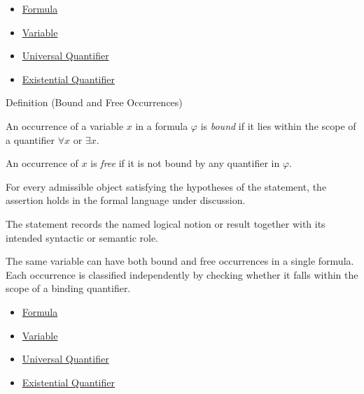\begin{dependencies}
\begin{itemize}
  \item \hyperref[def:formula]{Formula}
  \item \hyperref[def:variable]{Variable}
  \item \hyperref[def:universal-q]{Universal Quantifier}
  \item \hyperref[def:existential-q]{Existential Quantifier}
\end{itemize}
\end{dependencies}

\begin{definitionbox}{Definition (Bound and Free Occurrences)}
\begin{definition}\label{def:bound-free}
An occurrence of a variable $x$ in a formula $\varphi$ is \emph{bound} if it
lies within the scope of a quantifier $\forall x$ or $\exists x$.

An occurrence of $x$ is \emph{free} if it is not bound by any quantifier in
$\varphi$.
\end{definition}
\end{definitionbox}
\begin{remark*}
For every admissible object satisfying the hypotheses of the statement, the
assertion holds in the formal language under discussion.
\end{remark*}

\begin{remark*}[Interpretation]
The statement records the named logical notion or result together with its
intended syntactic or semantic role.
\end{remark*}


\begin{remark*}[Exposition]
The same variable can have both bound and free occurrences in a single formula.
Each occurrence is classified independently by checking whether it falls within
the scope of a binding quantifier.
\end{remark*}


\begin{dependencies}
\begin{itemize}
  \item \hyperref[def:formula]{Formula}
  \item \hyperref[def:variable]{Variable}
  \item \hyperref[def:universal-q]{Universal Quantifier}
  \item \hyperref[def:existential-q]{Existential Quantifier}
\end{itemize}
\end{dependencies}

